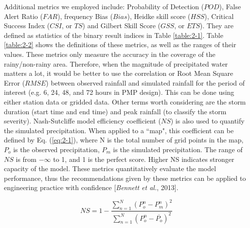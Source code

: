 Additional metrics we employed include: Probability of Detection ($POD$), False Alert Ratio ($FAR$), frequency Bias ($Bias$), Heidke skill score ($HSS$), Critical Success Index ($CSI$, or $TS$) and Gilbert Skill Score ($GSS$, or $ETS$). They are defined as statistics of the binary result indices in Table \ref{table:2-1}. Table \ref{table:2-2} shows the definitions of these metrics, as well as the ranges of their values. These metrics only measure the accuracy in the coverage of the rainy/non-rainy area. Therefore, when the magnitude of precipitated water matters a lot, it would be better to use the correlation or Root Mean Square Error ($RMSE$) between observed rainfall and simulated rainfall for the period of interest (e.g. 6, 24, 48, and 72 hours in PMP design). This can be done using either station data or gridded data. Other terms worth considering are the storm duration (start time and end time) and peak rainfall (to classify the storm severity). Nash-Sutcliffe model efficiency coefficient ($NS$) is also used to quantify the simulated precipitation. When applied to a ``map", this coefficient can be defined by Eq. (\ref{eq:2-1}), where N is the total number of grid points in the map, $P_o$ is the observed precipitation, $P_m$ is the simulated precipitation. The range of $NS$ is from $-\infty$ to 1, and 1 is the perfect score. Higher NS indicates stronger capacity of the model. These metrics quantitatively evaluate the model performance, thus the recommendations given by these metrics can be applied to engineering practice with confidence [\textit{Bennett et al.}, 2013].

\begin{equation}
	NS = 1 - \frac{{\sum\limits_{n = 1}^N {{{\left( {P_o^n - P_m^n} \right)}^2}} }}{{\sum\limits_{n = 1}^N {{{\left( {P_o^n - \overline {{P_o}} } \right)}^2}} }}
	\label{eq:2-1}
\end{equation}

